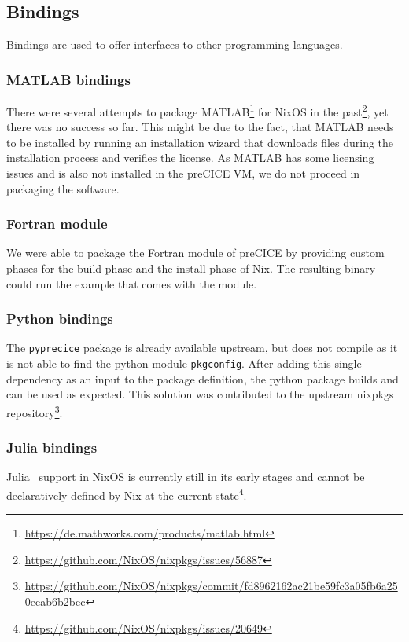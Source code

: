 \documentclass{eceasst}
\begin{document}
\subsection{Bindings}

Bindings are used to offer interfaces to other programming languages.

\subsubsection{MATLAB bindings}

There were several attempts to package MATLAB\footnote{\url{https://de.mathworks.com/products/matlab.html}} for NixOS in the past\footnote{\url{https://github.com/NixOS/nixpkgs/issues/56887}}, yet there was no success so far.
This might be due to the fact, that MATLAB needs to be installed by running an installation wizard that downloads files during the installation process and verifies the license.
As MATLAB has some licensing issues and is also not installed in the preCICE VM, we do not proceed in packaging the software.

\subsubsection{Fortran module}

We were able to package the Fortran module of preCICE by providing custom phases for the build phase and the install phase of Nix.
The resulting binary could run the example that comes with the module.

\subsubsection{Python bindings}

The \texttt{pyprecice} package is already available upstream, but does not compile as it is not able to find the python module \texttt{pkgconfig}.
After adding this single dependency as an input to the package definition, the python package builds and can be used as expected.
This solution was contributed to the upstream nixpkgs repository\footnote{\url{https://github.com/NixOS/nixpkgs/commit/fd8962162ac21be59fc3a05fb6a250eeab6b2bec}}.

\subsubsection{Julia bindings}

Julia~\cite{bezanson2017julia} support in NixOS is currently still in its early stages and cannot be declaratively defined by Nix at the current state\footnote{\url{https://github.com/NixOS/nixpkgs/issues/20649}}.
\end{document}
